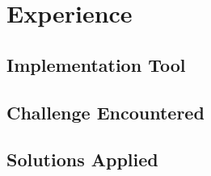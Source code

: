 \section{Experience}

\subsection{Implementation Tool}

\subsection{Challenge Encountered}


\subsection{Solutions Applied}


